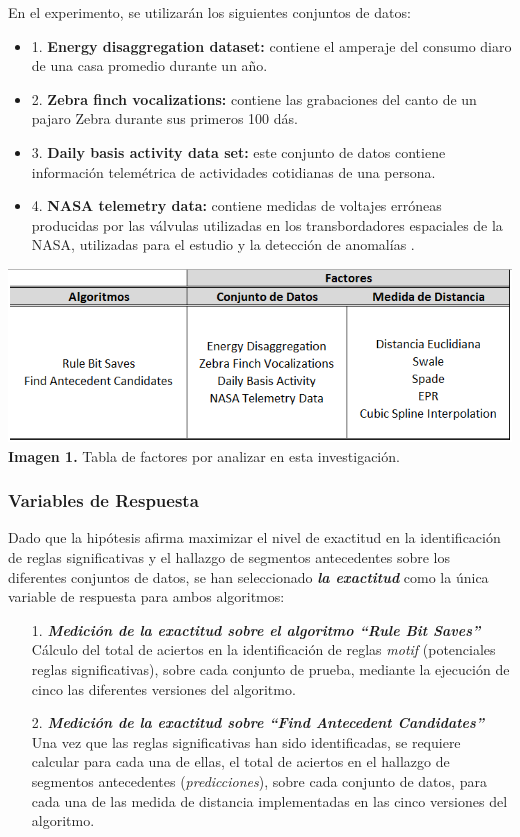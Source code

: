 \begin{itemize}
En el experimento, se utilizar\'an los siguientes conjuntos de datos:
\begin{itemize}
\item 1. \textbf{Energy disaggregation dataset:} contiene el amperaje del consumo diaro de una casa promedio durante un a\~no.
\item 2. \textbf{Zebra finch vocalizations:} contiene las grabaciones del canto de un pajaro Zebra durante sus primeros 100 d\'as.
\item 3. \textbf{Daily basis activity data set:} este conjunto de datos contiene informaci\'on telem\'etrica de actividades cotidianas de una persona.
\item 4. \textbf{NASA telemetry data:} contiene medidas de voltajes err\'oneas producidas por las v\'alvulas utilizadas en los transbordadores espaciales de la NASA, utilizadas para el estudio y la detecci\'on de anomal\'ias .
\end{itemize}
\end{itemize}
\begin{center}
\includegraphics[scale=0.7]{factors.png}\\
\vspace*{10pt}
\footnotesize{\textbf{Imagen 1.} Tabla de factores por analizar en esta investigaci\'on.}
\end{center}
\subsubsection{Variables de Respuesta}
Dado que la hip\'otesis afirma maximizar el nivel de exactitud en la identificaci\'on de reglas significativas y el hallazgo de segmentos antecedentes sobre los diferentes conjuntos de datos, se han seleccionado \textit{\textbf{la exactitud}} como la \'unica variable de respuesta para ambos algoritmos:
\begin{itemize}
\item [1.] \textbf{\textit{Medici\'on de la exactitud sobre el algoritmo \enquote{Rule Bit Saves}}}\\
C\'alculo del total de aciertos en la identificaci\'on de reglas \textit{motif} (potenciales reglas significativas), sobre cada conjunto de prueba, mediante la ejecuci\'on de cinco las diferentes versiones del algoritmo.
\item [2.] \textit{\textbf{Medici\'on de la exactitud sobre \enquote{Find Antecedent Candidates}}}\\ 
Una vez que las reglas significativas han sido identificadas, se requiere calcular para cada una de ellas, el total de aciertos en el hallazgo de segmentos antecedentes (\textit{predicciones}), sobre cada conjunto de datos, para cada una de las medida de distancia implementadas en las cinco versiones del algoritmo.
\end{itemize}
